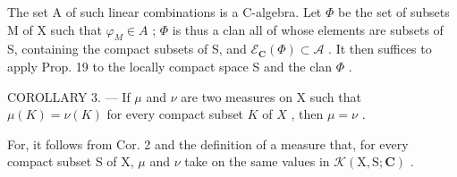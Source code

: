 The set A of such linear combinations is a C-algebra. Let \(\Phi\) be the set of subsets M of X such that \(\varphi_{M} \in A\) ; \(\Phi\) is thus a clan all of whose elements are subsets of S, containing the compact subsets of S, and \(\mathcal{E}_{\mathbf{C}}(\Phi) \subset \mathcal{A}\) . It then suffices to apply Prop. 19 to the locally compact space S and the clan \(\Phi\) .

COROLLARY 3. --- If \(\mu\) and \(\nu\) are two measures on X such that \(\mu(K) = \nu(K)\) for every compact subset \(K\) of \(X\) , then \(\mu = \nu\) .

For, it follows from Cor. 2 and the definition of a measure that, for every compact subset S of X, \(\mu\) and \(\nu\) take on the same values in \(\mathcal{K}(\mathrm{X},\mathrm{S};\mathbf{C})\) .

